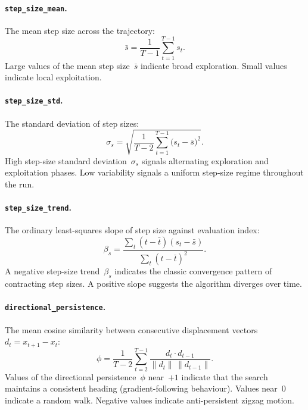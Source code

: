 \paragraph{\texttt{step\_size\_mean}.}
The mean step size across the trajectory:
\begin{equation}
\label{eq:step_mean}
  \bar{s} = \frac{1}{T-1}\sum_{t=1}^{T-1} s_t.
\end{equation}
Large values of the mean step size~$\bar{s}$ indicate broad exploration.
Small values indicate local exploitation.

\paragraph{\texttt{step\_size\_std}.}
The standard deviation of step sizes:
\begin{equation}
\label{eq:step_std}
  \sigma_s = \sqrt{\frac{1}{T-2}\sum_{t=1}^{T-1}
    \bigl(s_t - \bar{s}\bigr)^2}.
\end{equation}
High step-size standard deviation~$\sigma_s$ signals alternating
exploration and exploitation phases. Low variability signals a uniform
step-size regime throughout the run.

\paragraph{\texttt{step\_size\_trend}.}
The ordinary least-squares slope of step size against evaluation index:
\begin{equation}
\label{eq:step_trend}
  \beta_s
    = \frac{\sum_{t}(t - \bar{t})(s_t - \bar{s})}
           {\sum_{t}(t - \bar{t})^2}.
\end{equation}
A negative step-size trend~$\beta_s$ indicates the classic convergence
pattern of contracting step sizes. A positive slope suggests the
algorithm diverges over time.

\paragraph{\texttt{directional\_persistence}.}
The mean cosine similarity between consecutive displacement vectors
$d_t = x_{t+1} - x_t$:
\begin{equation}
\label{eq:dir_persist}
  \phi = \frac{1}{T-2}\sum_{t=2}^{T-1}
    \frac{d_t \cdot d_{t-1}}
         {\lVert d_t \rVert \, \lVert d_{t-1} \rVert}.
\end{equation}
Values of the directional persistence~$\phi$ near~$+1$ indicate that the
search maintains a consistent heading
(gradient-following behaviour). Values near~$0$ indicate a random walk.
Negative values indicate anti-persistent zigzag motion.


